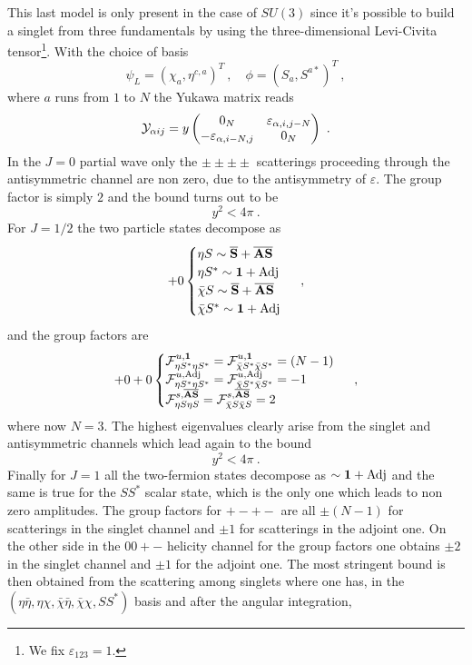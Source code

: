 \documentclass[a4paper,11pt]{article}
\newcommand{\be}{\begin{equation}}
\newcommand{\ee}{\end{equation}}
\newcommand{\nn}{\nonumber}
\begin{document}
This last model is only present in the case of $SU(3)$ since it's possible to build a singlet from three fundamentals by using the three-dimensional Levi-Civita tensor\footnote{We fix $\varepsilon_{123}=1$.}.  With the choice of basis
\be
\psi_L = (\chi_{a}, \eta^{c,a})^T \ , \quad \phi = (S_a,S^{a*})^T  \ , 
\ee
where $a$ runs from $1$ to $N$ the Yukawa matrix reads
\be
{\cal Y}_{\alpha i j} = y
\begin{pmatrix}
0_N & \varepsilon_{\alpha,i,j-N} \\
- \varepsilon_{\alpha,i-N,j} & 0_N
\end{pmatrix} \ .
\\
\ee
In the $J=0$ partial wave only the $\pm\pm\pm\pm$ scatterings proceeding through the antisymmetric channel are non zero, due to the antisymmetry of $\varepsilon$. The group factor is simply $2 $ and the bound turns out to be
\be
y^2 < 4\pi \ .
\ee
For $J=1/2$ the two particle states decompose as
 \be
+0
\begin{cases}
\eta S  \sim  {\rm{\bf{\overline{S}}}}+{\rm{\bf \overline{AS}}} \nn \\
\eta S^*  \sim {\bf 1}+{\rm Adj}\nn \\
\bar\chi S \sim {\rm{\bf{\overline{S}}}}+{\rm{\bf \overline{AS}}}  \nn \\
\bar\chi S^*  \sim{\bf 1}+{\rm Adj} \nn \\
\end{cases} \ ,
\ee
and the group factors are
\begin{align}+0+0
\begin{cases}
{\cal F}^{u,{{{\bf 1}}} }_{\eta S^*\eta S^*} = {\cal F}^{u,{{{\bf 1}}} }_{\bar\chi S^*\bar\chi S^*}  =(N-1)\\ 
%
{\cal F}^{u,{{{\rm Adj}}} }_{\eta S^*\eta S^*} = {\cal F}^{u,{{{\rm Adj}}} }_{\bar\chi S^*\bar\chi S^*}  = -1\\ 
%
{\cal F}^{s,{\overline{{\bf AS}}} }_{\eta S\eta S} = {\cal F}^{s,{\overline{{\bf AS}}} }_{\bar\chi S\bar\chi S}= 2 \\ 
%
\end{cases} \ ,
\end{align}
where now $N=3$.
The highest eigenvalues clearly arise from the singlet and antisymmetric channels which lead again to the bound
\be
y^2 < 4\pi \ .
\ee
Finally for $J=1$  all the two-fermion states decompose as $ \sim  {\bf 1}+ {\rm Adj} $ and the same is true for the $S S^*$ scalar state, which is the only one which leads to non zero amplitudes. The group factors for $+-+-$ are all $\pm(N-1)$ for scatterings in the singlet channel and $\pm1$ for scatterings in the adjoint one.  On the other side in the $00+-$ helicity channel for the group factors one obtains $\pm 2$ in the singlet channel and $\pm 1$ for the adjoint one. The most stringent bound is then obtained from the scattering among singlets where one has, in the $( \eta\bar \eta, \eta \chi, \bar\chi\bar\eta, \bar\chi\chi,S S^*)$ basis and after the angular integration,
\end{document}
